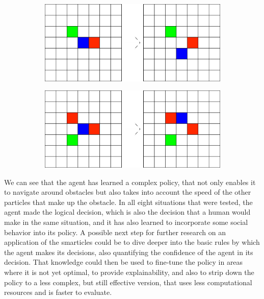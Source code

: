 \begin{figure}[H]\ContinuedFloat
        \begin{subfigure}[T]{0.45\textwidth}
            \centering
            \includegraphics[width=\textwidth]{playground/7.png}
            \label{fig:playground_7}
        \end{subfigure}
        \hfill
        \begin{subfigure}[T]{0.45\textwidth}
            \centering
            \includegraphics[width=\textwidth]{playground/8.png}
            \label{fig:playground_8}
        \end{subfigure}
\end{figure}

We can see that the agent has learned a complex policy, that not only enables it to navigate around obstacles but also takes into account the speed of the other particles that make up the obstacle. In all eight situations that were tested, the agent made the logical decision, which is also the decision that a human would make in the same situation, and it has also learned to incorporate some social behavior into its policy. A possible next step for further research on an application of the smarticles could be to dive deeper into the basic rules by which the agent makes its decisions, also quantifying the confidence of the agent in its decision. That knowledge could then be used to fine-tune the policy in areas where it is not yet optimal, to provide explainability, and also to strip down the policy to a less complex, but still effective version, that uses less computational resources and is faster to evaluate. 

